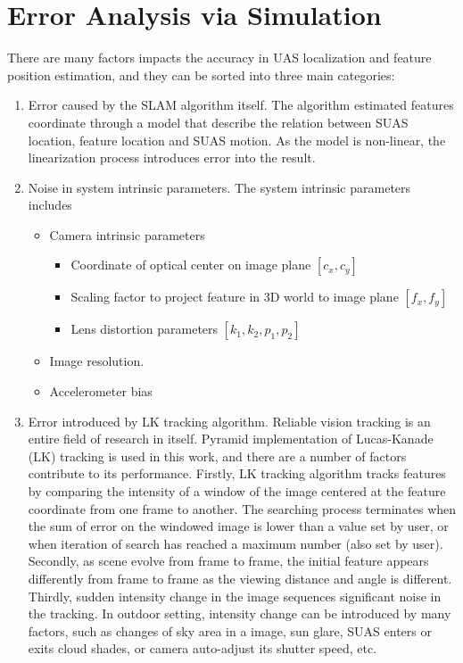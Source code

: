 \chapter{Error Analysis via Simulation}\label{ch:simulation}
There are many factors impacts the accuracy in UAS localization and 
feature position estimation, and they can be sorted into three main 
categories: 

\begin{enumerate}
  \item Error caused by the SLAM algorithm itself. The algorithm
  estimated features coordinate through a model that describe the
  relation between SUAS location, feature location and SUAS motion. As
  the model is non-linear, the linearization process introduces error
  into the result.
  \item Noise in system intrinsic parameters. The system intrinsic
  parameters includes
  \begin{itemize}
    \item Camera intrinsic parameters
    \begin{itemize}
      \item Coordinate of optical center on image plane $[c_{x}, c_{y}]$
      \item Scaling factor to project feature in 3D world to image
      plane $ [f_{x}, f_{y}]$
      \item Lens distortion parameters $[k_{1}, k_{2}, p_{1}, p_{2}]$
    \end{itemize}
    \item Image resolution.
    \item Accelerometer bias 
  \end{itemize}
  \item Error introduced by LK tracking algorithm. Reliable vision
  tracking is an entire field of research in itself. Pyramid
  implementation of Lucas-Kanade (LK) tracking is used in this work,
  and there are a number of factors contribute to its performance.
  Firstly, LK tracking algorithm tracks features by comparing the
  intensity of a window of the image centered at the feature
  coordinate from one frame to another. The searching process
  terminates when the sum of error on the windowed image is lower than
  a value set by user, or when iteration of search has reached a
  maximum number (also set by user). Secondly, as scene evolve from
  frame to frame, the initial feature appears differently from frame
  to frame as the viewing distance and angle is different. Thirdly,
  sudden intensity change in the image sequences significant noise in
  the tracking. In outdoor setting, intensity change can be introduced
  by many factors, such as changes of sky area in a image, sun glare,
  SUAS enters or exits cloud shades, or camera auto-adjust its shutter
  speed, etc.

\end{enumerate}

